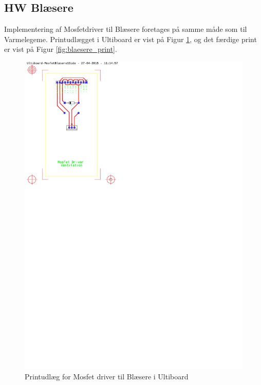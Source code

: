 \clearpage

\subsection{HW Blæsere}

Implementering af Mosfetdriver til Blæsere foretages på samme måde som til Varmelegeme.
Printudlægget i Ultiboard er vist på Figur \ref{fig:ultiboard_blaesere}, og det færdige print er vist på Figur \ref{fig:blaesere_print}.

\begin{figure}[h]
\centering 
\includegraphics[width={\textwidth-8cm}, trim=50 520 390 30, clip=true, angle =90] {../fig/ultiboard_blaesere.pdf}
\caption{Printudlæg for Mosfet driver til Blæsere i Ultiboard}
\label{fig:ultiboard_blaesere}
\end{figure}

